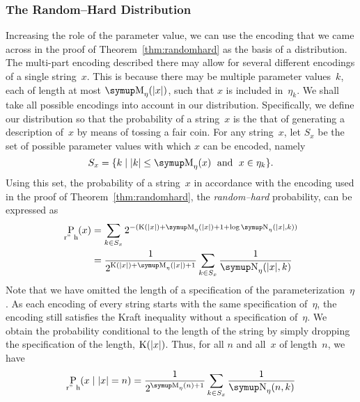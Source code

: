 \subsubsection{The Random--Hard Distribution}
Increasing the role of the parameter value, we can use the encoding that we came across in the proof of Theorem~\ref{thm:randomhard} as the basis of a distribution.
The multi-part encoding described there may allow for several different encodings of a single string~$x$.
This is because there may be multiple parameter values~$k$, each of length at most $\upM_\eta(\length{x})$, such that $x$ is included in~$\eta_k$.
We shall take all possible encodings into account in our distribution.
Specifically, we define our distribution so that the probability of a string~$x$ is the that of generating a description of~$x$ by means of tossing a fair coin.
For any string~$x$, let $S_x$ be the set of possible parameter values with which $x$ can be encoded, namely
\begin{equation*}
  S_x \deq\{k \st \length{k} \le \upM_\eta(x) \reland x \in \eta_k\}.
\end{equation*}
Using this set, the probability of a string~$x$ in accordance with the encoding used in the proof of Theorem~\ref{thm:randomhard}, the \emph{random--hard} probability, can be expressed as
\begin{align*}
  \Pr_\mathrm{r"~h}(x) &\deq \sum_{k \in S_x} 2^{-(\KC(\length{x}) + \upM_\eta(\length{x}) + 1 + \log \upN_\eta(\length{x}, k))} \\
    &= \frac{1}{2^{\KC(\length{x}) + \upM_\eta(\length{x}) + 1}} \sum_{k \in S_x} \frac{1}{\upN_\eta(\length{x}, k)}
\end{align*}
Note that we have omitted the length of a specification of the parameterization~$\eta$.
As each encoding of every string starts with the same specification of~$\eta$, the encoding still satisfies the Kraft inequality without a specification of~$\eta$.
We obtain the probability conditional to the length of the string by simply dropping the specification of the length, $\operatorname{K}({\lvert x\rvert})$.
Thus, for all $n$ and all~$x$ of length~$n$, we have
\begin{equation*}
  \Pr_\mathrm{r"~h}(x \given \length{x} = n) = \frac{1}{2^{\upM_\eta(n) + 1}} \sum_{k \in S_x} \frac{1}{\upN_\eta(n, k)}
\end{equation*}

